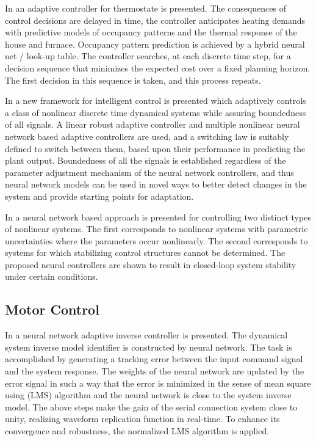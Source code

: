 \documentclass[conference]{IEEEtran}
\begin{document}
In \cite{Mozer1996TheNP} an adaptive controller for thermostate is presented. The consequences of control decisions are delayed in time, the controller anticipates heating demands with predictive models of occupancy patterns and the thermal response of the house and furnace. Occupancy pattern prediction is achieved by a hybrid neural net / look-up table. The controller searches, at each discrete time step, for a decision sequence that minimizes the expected cost over a fixed planning horizon. The first decision in this sequence is taken, and this process repeats.

In \cite{chen2002ICDC}  a new framework for intelligent control is presented which adaptively controls a class of nonlinear discrete time dynamical systems while assuring boundedness of all signals. A linear robust adaptive controller and multiple nonlinear neural network based adaptive controllers are used, and a switching law is suitably defined to switch between them, based upon their performance in predicting the plant output. Boundedness of all the signals is established regardless of the parameter adjustment mechanism of the neural network controllers, and thus neural network models can be used in novel ways to better detect changes in the system and provide starting points for adaptation.

In \cite{yu1996nips} a neural network based approach is presented for controlling two distinct types of nonlinear systems. The first corresponds to nonlinear systems with parametric uncertainties where the parameters occur nonlinearly. The second corresponds to systems for which stabilizing control structures cannot be determined. The proposed neural controllers are shown to result in closed-loop system stability under certain conditions.

\subsection{Motor Control}

\cite{yao2010adaline, nouri2008adaptive, aamir13pid, kumarawadu2010discrete-time, brdys1999dynamic}

In \cite{yao2010adaline} a neural network adaptive inverse controller is presented. The dynamical system inverse model identifier is constructed by neural network. The task is accomplished by generating a tracking error between the input command signal and the system response. The weights of the neural network are updated by the error signal in such a way that the error is minimized in the sense of mean square using (LMS) algorithm and the neural network is close to the system inverse model. The above steps make the gain of the serial connection system close to unity, realizing waveform replication function in real-time. To enhance its convergence and robustness, the normalized LMS algorithm is applied.
\end{document}
